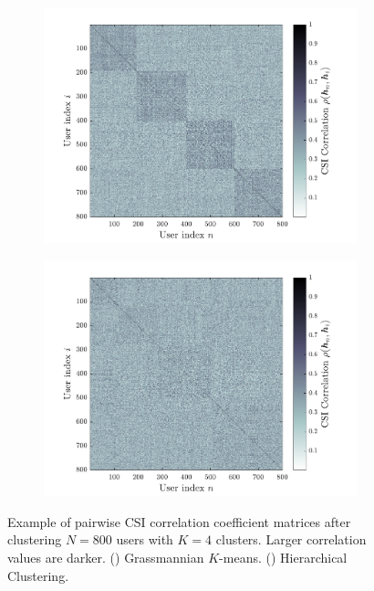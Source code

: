 \begin{figure}[htb]
	\centering
	\begin{subfigure}[b]{0.48\linewidth}
		\centering
		\includegraphics[width=.95\linewidth]{./figs/usch_figs/pairwise_corr_all_users_GKM_M8_N800_K4.pdf}
		\label{usch:fig:pwc_gkm_bc}
	\end{subfigure}
	\begin{subfigure}[b]{0.48\linewidth}
		\centering
		\includegraphics[width=.95\linewidth]{./figs/usch_figs/pairwise_corr_all_users_AHP_M8_N800_K4.pdf}
		 \label{usch:fig:pwc_AHP_bc}
	\end{subfigure}\hfill
	\caption[Example of pairwise CSI correlation coefficient matrices after clustering $N=800$ users with $K=4$ clusters.]{Example of pairwise CSI correlation coefficient matrices after clustering $N=800$ users with $K=4$ clusters. Larger correlation values are darker. 
		() Grassmannian $K$-means. () Hierarchical Clustering.}
	\label{usch:fig:clusters_pwc_M8_K4_N800}
\end{figure}

